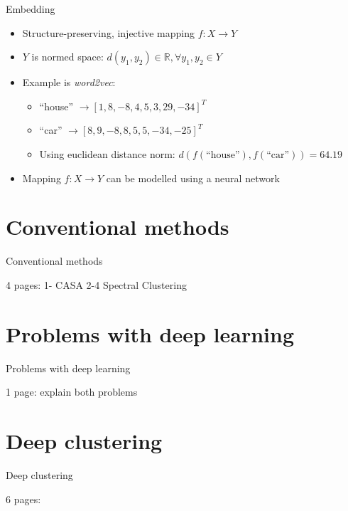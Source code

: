 \documentclass[xcolor=table,mathserif,9pt]{beamer}    %
\begin{document}
\begin{frame}{Embedding}

	\begin{itemize}
		\item Structure-preserving, injective mapping $f: X \to Y$
		\item $Y$ is normed space: $d(y_1,y_2) \in \mathbb{R}, \forall y_1,y_2 \in Y$
		\item Example is \emph{word2vec}: 
			\begin{itemize}
				\item ``house'' $\to \left[1, 8, -8, 4, 5, 3, 29, -34\right]^{T}$
				\item ``car'' $\to \left[8,9, -8, 8, 5, 5, -34, -25\right]^{T}$
				\item Using euclidean distance norm: $d(f(\text{``house''}),f(\text{``car''})) = 64.19$ 
			\end{itemize}
		\item Mapping $f: X \to Y$ can be modelled using a neural network
	\end{itemize}



\end{frame}

\section{Conventional methods}%
\label{sec:conventional_methods}
\begin{frame}{Conventional methods}

4 pages:
	1- CASA
	2-4 Spectral Clustering
\end{frame}

\section{Problems with deep learning}%
\label{sec:problems_with_deep_learning}
\begin{frame}{Problems with deep learning}

1 page: explain both problems
\end{frame}

\section{Deep clustering}%
\label{sec:deep_clustering}
\begin{frame}{Deep clustering}

6 pages:
\end{frame}
\end{document}
